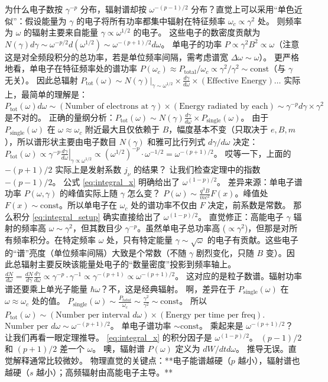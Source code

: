 \documentclass[12pt,oneside]{ctexart}
\theoremstyle{definition}
\theoremstyle{plain}
\theoremstyle{remark}
\begin{document}
为什么电子数按 $\gamma^{-p}$ 分布，辐射谱却按 $\omega^{-(p-1)/2}$ 分布？直觉上可以采用“单色近似”：假设能量为 $\gamma$ 的电子将所有功率都集中辐射在特征频率 $\omega_c \propto \gamma^2$ 处。
则频率为 $\omega$ 的辐射主要来自能量 $\gamma \propto \omega^{1/2}$ 的电子。
这些电子的数密度贡献为 $N(\gamma)d\gamma \sim \omega^{-p/2} d(\omega^{1/2}) \sim \omega^{-(p+1)/2} d\omega$。
单电子的功率 $P \propto \gamma^2 B^2 \propto \omega$（注意这是对全频段积分的总功率，若是单位频率间隔，需考虑谱宽 $\Delta \omega \sim \omega$）。
更严格地看，单电子在特征频率处的谱功率 $P(\omega_c) \approx P_{\text{total}} / \omega_c \propto \gamma^2 / \gamma^2 \sim \text{const}$（与 $\gamma$ 无关）。
因此总辐射 $P_{\text{tot}}(\omega) \sim N(\gamma)|_{\gamma \sim \omega^{1/2}} \times \frac{d\gamma}{d\omega} \times (\text{Effective Energy}) \dots$
实际上，最简单的理解是：$P_{\text{tot}}(\omega) d\omega \sim (\text{Number of electrons at } \gamma) \times (\text{Energy radiated by each}) \sim \gamma^{-p} d\gamma \times \gamma^2$ 是不对的。
正确的量纲分析：$P_{\text{tot}}(\omega) \sim N(\gamma) \frac{d\gamma}{d\omega} \times P_{\text{single}}(\omega)$。
由于 $P_{\text{single}}(\omega)$ 在 $\omega \approx \omega_c$ 附近最大且仅依赖于 $B$，幅度基本不变（只取决于 $e, B, m$），所以谱形状主要由电子数目 $N(\gamma)$ 和雅可比行列式 $d\gamma/d\omega$ 决定：
$P_{\text{tot}}(\omega) \propto \left. \gamma^{-p} \frac{d\gamma}{d\omega} \right|_{\gamma \propto \omega^{1/2}} \propto (\omega^{1/2})^{-p} \cdot \omega^{-1/2} = \omega^{-(p+1)/2}$。
哎等一下，上面的 $-(p+1)/2$ 实际上是发射系数 $j_\nu$ 的结果？
让我们检查定理中的指数 $-(p-1)/2$。
公式 \eqref{eq:integral_x} 明确给出了 $\omega^{(1-p)/2}$。
差异来源：单电子谱功率 $P(\omega, \gamma)$ 的峰值实际上随 $\gamma$ 怎么变？
$P(\omega) \sim \frac{q^3 B}{m c^2} F(x)$。峰值处 $F(x) \sim \text{const}$。所以单电子在 $\omega_c$ 处的谱功率不仅由 $F$ 决定，前系数是常数。
那么积分 \eqref{eq:integral_setup} 确实直接给出了 $\omega^{(1-p)/2}$。
直觉修正：高能电子 $\gamma$ 辐射的频率高 $\omega \sim \gamma^2$，但其数目少 $\gamma^{-p}$。虽然单电子总功率高 ($\propto \gamma^2$)，但那是对所有频率积分。在特定频率 $\omega$ 处，只有特定能量 $\gamma \sim \sqrt{\omega}$ 的电子有贡献。这些电子的“谱”亮度（单位频率间隔）大致是个常数（不随 $\gamma$ 剧烈变化，只随 $B$ 变）。因此总辐射主要反映该能量处电子的“数量密度”投影到频率轴上。
$\frac{dN}{d\omega} = \frac{dN}{d\gamma} \frac{d\gamma}{d\omega} \propto \gamma^{-p} \cdot \gamma^{-1} \propto \gamma^{-(p+1)} \propto \omega^{-(p+1)/2}$。
这对应的是粒子数谱。辐射功率谱还要乘上单光子能量 $\hbar \omega$？不，这是经典辐射。
啊，差异在于 $P_{\text{single}}(\omega)$ 在 $\omega \approx \omega_c$ 处的值。
$P_{\text{single}}(\omega) \sim \frac{P_{total}}{\omega_c} \sim \frac{\gamma^2}{\gamma^2} \sim \text{const}$。
所以 $P_{\text{tot}}(\omega) \sim (\text{Number per interval } d\omega) \times (\text{Energy per time per freq})$.
$\text{Number per } d\omega \sim \omega^{-(p+1)/2}$。
单电子谱功率 $\sim \text{const}$。
乘起来是 $\omega^{-(p+1)/2}$？
让我们再看一眼定理推导。 \eqref{eq:integral_x} 的积分因子是 $\omega^{(1-p)/2}$。
$(p-1)/2$ 和 $(p+1)/2$ 差一个 $\omega$。
噢，辐射谱 $P(\omega)$ 定义为 $dW/dtd\omega$。
推导无误。直觉解释通常比较微妙。
物理直觉的关键点：**电子能谱越硬（$p$ 越小），辐射谱也越硬（$s$ 越小）；高频辐射由高能电子主导。**
\end{document}
